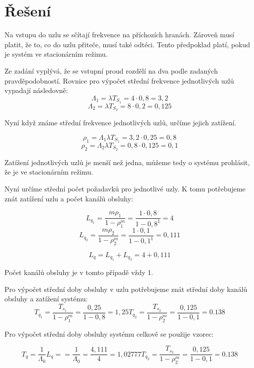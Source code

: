 \documentclass{article}
\begin{document}
\section{Řešení}%

Na vstupu do uzlu se sčítají frekvence na příchozích hranách. 
Zároveň musí platit, že to, co do uzlu přiteče, musí také odtéci. 
Tento předpoklad platí, pokud je systém ve stacionárním režimu.

Ze zadání vyplývá, že se vstupní proud rozdělí na dva podle zadaných pravděpodobností. 
Rovnice pro výpočet střední frekvence jednotlivých uzlů vypadají následovně:
$$
\Lambda_1 = \lambda T_{S_1} = 4 \cdot 0,8 = 3,2     
$$
$$
\Lambda_2 = \lambda T_{S_2} = 8 \cdot 0,2 = 0,125 
$$

Nyní když známe střední frekvence jednotlivých uzlů, určíme jejich zatížení.

$$
\rho_1 = \Lambda_1\lambda T_{S_1} = 3,2 \cdot 0,25 = 0,8     
$$
$$
\rho_2 = \Lambda_2\lambda T_{S_2} = 0,8 \cdot 0,125 = 0,1
$$

Zatížení jednotlivých uzlů je menší než jedna, můžeme tedy o systému prohlásit, že je ve stacionárním režimu.

Nyní určíme střední počet požadavků pro jednotlivé uzly. K tomu potřebujeme znát zatížení uzlu a počet kanálů obsluhy:

$$
L_{q_1} = \frac{m\rho_{1}}{1-\rho_{1}^m} = \frac{1\cdot0,8}{1-0,8^1} = 4
$$
$$
L_{q_2} = \frac{m\rho_{2}}{1-\rho_{2}^m} = \frac{1\cdot0,1}{1-0,1^1} = 0,111
$$

$$
L_{q} = L_{q_1} + L_{q_2} = 4 + 0,111
$$

Počet kanálů obsluhy je v tomto případě vždy 1.

Pro výpočet střední doby obsluhy v uzlu potřebujeme znát střední doby kanálů obsluhy a zatížení systému:
$$
T_{q_1} =\frac{T_{s_1}}{1 - \rho_{1}^m} = \frac{0,25}{1-0,8} = 1,25
T_{q_2} =\frac{T_{s_2}}{1 - \rho_{2}^m} = \frac{0,125}{1-0,1} = 0.138
$$

Pro výpočet střední doby obsluhy systému celkově se použije vzorec:

$$
T_{q} =\frac{1}{\Lambda_0}L_q = =\frac{1}{\Lambda_0} = \frac{4,111}{4} = 1,02777
T_{q_2} =\frac{T_{s_2}}{1 - \rho_{2}^m} = \frac{0,125}{1-0,1} = 0.138
$$
\end{document}
